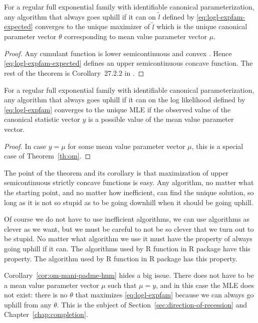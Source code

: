 \begin{theorem} \label{th:om}
For a regular full exponential family with identifiable canonical
parameterization,
any algorithm that always goes uphill if it can on $\tilde{l}$
defined by \eqref{eq:logl-expfam-expected}
converges to the unique maximizer of $\tilde{l}$ which is the unique
canonical parameter vector $\theta$ corresponding to mean value
parameter vector $\mu$.
\end{theorem}
\begin{proof}
Any cumulant function is lower semicontinuous and convex
\citep[Theorem~7.1]{barndorff-nielsen}.
Hence \eqref{eq:logl-expfam-expected}
defines an upper semicontinuous concave function.
The rest of the theorem is Corollary~{27.2.2} in \citep{rockafellar}.
\end{proof}
\begin{corollary} \label{cor:om-mani-padme-hum}
For a regular full exponential family with identifiable canonical
parameterization,
any algorithm that always goes uphill if it can on the log likelihood
defined by \eqref{eq:logl-expfam} converges to the unique MLE if the observed
value of the canonical statistic vector $y$ is a possible value of the
mean value parameter vector.
\end{corollary}
\begin{proof}
In case $y = \mu$ for some mean value parameter vector $\mu$,
this is a special case of Theorem~\ref{th:om}.
\end{proof}

The point of the theorem and its corollary is that maximization
of upper semicontinuous strictly concave functions is easy.
Any algorithm, no matter what the starting point,
and no matter how inefficient,
can find the unique solution,
so long as it is not so stupid as to be
going downhill when it should be going uphill.

Of course we do not have to use inefficient algorithms, we can use
algorithms as clever as we want, but we must be careful to not be so
clever that we turn out to be stupid.  No matter what algorithm we
use it must have the property of always going uphill if it can.
The algorithms used by R function  in R package 
have this property.
The algorithm used by R function  in
R package 
has this property.

Corollary~\ref{cor:om-mani-padme-hum} hides a big issue.
There does not have to be a mean value parameter vector $\mu$ such that
$\mu = y$, and in this case the MLE does not exist: there is no $\theta$
that maximizes \eqref{eq:logl-expfam} because we can always go uphill
from any $\theta$.  This is the subject
of Section~\ref{sec:direction-of-recession} and Chapter~\ref{chap:completion}.

